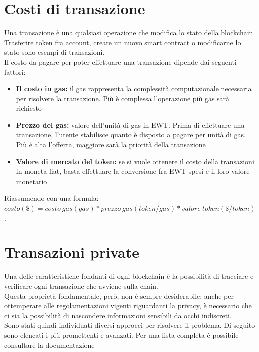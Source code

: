 \documentclass[12pt, letterpaper, twoside]{article}
\begin{document}
\newpage
 
\section{Costi di transazione}
Una transazione è una qualsiasi operazione che modifica lo stato della blockchain. Trasferire token fra account, creare un nuovo smart contract o modificarne lo stato sono esempi di transazioni. \\
Il costo da pagare per poter effettuare una transazione dipende dai seguenti fattori:
 
\begin{itemize}
    \item \textbf{Il costo in gas:} il gas rappresenta la complessità computazionale necessaria per risolvere la transazione. Più è complessa l'operazione più gas sarà richiesto
    \item \textbf{Prezzo del gas:} valore dell'unità di gas in EWT. Prima di effettuare una transazione, l'utente stabilisce quanto è disposto a pagare per unità di gas. Più è alta l'offerta, maggiore sarà la priorità della transazione
    \item \textbf{Valore di mercato del token:} se si vuole ottenere il costo della transazioni in moneta fiat, basta effettuare la conversione fra EWT spesi e il loro valore monetario
\end{itemize}
 
Riassumendo con una formula: \\
$ costo(\$) = costo\ gas(gas) * prezzo\ gas(token/gas) * valore\ token (\$/token) $. \\
 
\newpage
 
\section{Transazioni private}
Una delle caratteristiche fondanti di ogni blockchain è la possibilità di tracciare e verificare ogni transazione che avviene sulla chain. \\
Questa proprietà fondamentale, però, non è sempre desiderabile: anche per ottemperare alle regolamentazioni vigenti riguardanti la privacy, è necessario che ci sia la possibilità di nascondere informazioni sensibili da occhi indiscreti. \\
Sono stati quindi individuati diversi approcci per risolvere il problema. 
Di seguito sono elencati i più promettenti e avanzati.
Per una lista completa è possibile consultare la documentazione \cite{wiki:ew-privacy}
 
\end{document}
